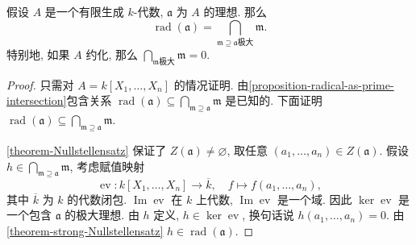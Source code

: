 \begin{proposition}
  \label{proposition-radical-as-maximal-intersection-in-finite-generated-algebra-over-field}
  假设 \( A \) 是一个有限生成 \( k \)-代数, \( \mathfrak{a} \) 为 \( A \)
  的理想.
  那么
  \[
    \operatorname{rad}(\mathfrak{a}) = \bigcap_{\mathfrak{m} \supseteq
    \mathfrak{a} \text{极大}} \mathfrak{m}.
  \]
  特别地, 如果 \( A \) 约化, 那么 \( \bigcap_{\mathfrak{m} \text{极大}}
  \mathfrak{m} = 0 \).
\end{proposition}
\begin{proof}
  只需对 \( A = k[X_1, \ldots, X_n] \) 的情况证明.
  由\cref{proposition-radical-as-prime-intersection}包含关系 \( \operatorname{rad}(\mathfrak{a}) \subseteq \bigcap_{\mathfrak{m}
  \supseteq \mathfrak{a}} \mathfrak{m} \) 是已知的.
  下面证明\( \operatorname{rad}(\mathfrak{a}) \subseteq \bigcap_{\mathfrak{m}
  \supseteq \mathfrak{a}} \mathfrak{m} \).

  \cref{theorem-Nullstellensatz} 保证了 \( Z(\mathfrak{a}) \neq \varnothing \),
  取任意 \( (a_1, \ldots, a_n) \in Z(\mathfrak{a}) \).
  假设 \( h \in \bigcap_{\mathfrak{m} \supseteq \mathfrak{a}} \mathfrak{m} \),
  考虑赋值映射
  \[
    \operatorname{ev}: k[X_1, \ldots, X_n] \to \overline{k},\quad f \mapsto f(a_1, \ldots, a_n),
  \]
  其中 \( \overline{k} \) 为 \( k \) 的代数闭包.
  \( \operatorname{Im} \operatorname{ev} \) 在 \( k \) 上代数, \(
  \operatorname{Im} \operatorname{ev} \) 是一个域.
  因此 \( \operatorname{ker} \operatorname{ev} \) 是一个包含 \( \mathfrak{a} \)
  的极大理想.
  由 \( h \) 定义, \( h \in \operatorname{ker} \operatorname{ev} \), 换句话说 \(
  h(a_1, \ldots, a_n) = 0 \).
  由\cref{theorem-strong-Nullstellensatz} \( h \in
  \operatorname{rad}(\mathfrak{a}) \).
\end{proof}

